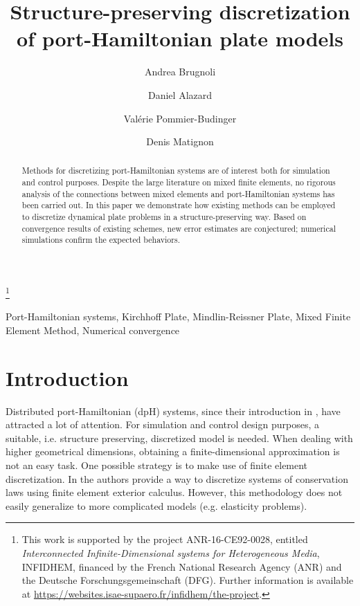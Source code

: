 \documentclass{ifacconf}
\begin{document}
\begin{frontmatter}

\title{Structure-preserving discretization of port-Hamiltonian plate models } 

\thanks[footnoteinfo]{This work is  supported by the project ANR-16-CE92-0028,
	entitled {\em Interconnected Infinite-Dimensional systems for Heterogeneous
		Media}, INFIDHEM, financed by the French National
	Research Agency (ANR) and the Deutsche Forschungsgemeinschaft (DFG). Further information is available at {\url{https://websites.isae-supaero.fr/infidhem/the-project}}.
	}

\author[ISAE]{Andrea Brugnoli}
\author[ISAE]{Daniel Alazard} 
\author[ISAE]{Val\'erie Pommier-Budinger}
\author[ISAE]{Denis Matignon}

\address[ISAE]{ISAE-SUPAERO, Universit\'e de Toulouse, France.\\
	10 Avenue Edouard Belin, BP-54032, 31055 Toulouse Cedex 4. \\
	Andrea.Brugnoli@isae.fr,  Daniel.Alazard@isae.fr, \\
	Valerie.Budinger@isae.fr, Denis.Matignon@isae.fr}

\begin{abstract}
Methods for discretizing port-Hamiltonian systems are of interest both for simulation and control purposes. Despite the large literature on mixed finite elements, no rigorous analysis of the connections between mixed elements and port-Hamiltonian systems has been carried out. In this paper we demonstrate how existing methods can be employed to discretize dynamical plate problems in a structure-preserving way. Based on convergence results of existing schemes, new error estimates are conjectured; numerical simulations confirm the expected behaviors.
\end{abstract}

\begin{keyword}
Port-Hamiltonian systems, Kirchhoff Plate, Mindlin-Reissner Plate, Mixed Finite Element Method, Numerical convergence
\end{keyword}

\end{frontmatter}

\section{Introduction}
Distributed port-Hamiltonian (dpH) systems, since their introduction in \cite{VANDERSCHAFTdph}, have attracted a lot of attention. For simulation and control design purposes, a suitable, i.e. structure preserving, discretized model is needed. When dealing with higher geometrical dimensions, obtaining a finite-dimensional approximation is not an easy task. One possible strategy is to make use of finite element discretization. In \cite{WeakForm_Kot} the authors provide a way to discretize systems of conservation laws using finite element exterior calculus. However, this methodology does not easily generalize to more complicated models (e.g. elasticity problems).
\end{document}
